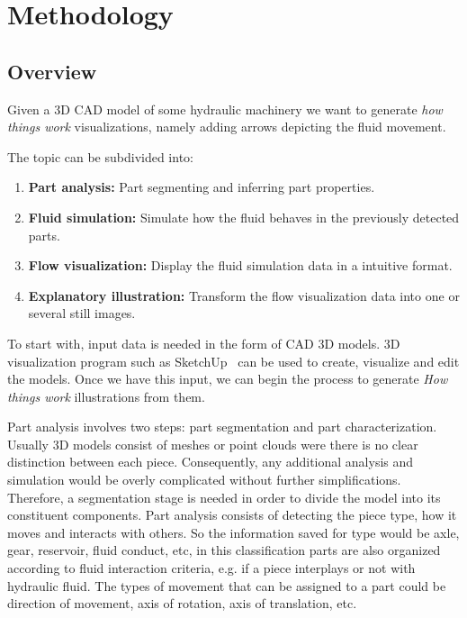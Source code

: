 \chapter{Methodology}

\section{Overview}

Given a 3D CAD model of some hydraulic machinery we want to generate \textit{how things work} visualizations, namely adding arrows depicting the fluid movement.

The topic can be subdivided into:
\begin{enumerate}
\item \textbf{Part analysis:} Part segmenting and inferring part properties.
\item \textbf{Fluid simulation:} Simulate how the fluid behaves in the previously detected parts.
\item \textbf{Flow visualization:} Display the fluid simulation data in a intuitive format.
\item \textbf{Explanatory illustration:} Transform the flow visualization data into one or several still images.
\end{enumerate}

To start with, input data is needed in the form of CAD 3D models.
3D visualization program such as SketchUp~\cite{Trimble2014} can be used to create, visualize and edit the models.
Once we have this input, we can begin the process to generate \textit{How things work} illustrations from them.

Part analysis involves two steps: part segmentation and part characterization.
Usually 3D models consist of meshes or point clouds were there is no clear distinction between each piece.
Consequently, any additional analysis and simulation would be overly complicated without further simplifications.  
Therefore, a segmentation stage is needed in order to divide the model into its constituent components.
Part analysis consists of detecting the piece type, how it moves and interacts with others.
So the information saved for type would be axle, gear, reservoir, fluid conduct, etc, in this classification parts are also organized according to fluid interaction criteria, e.g. if a piece interplays or not with hydraulic fluid.
The types of movement that can be assigned to a part could be direction of movement, axis of rotation, axis of translation, etc.

